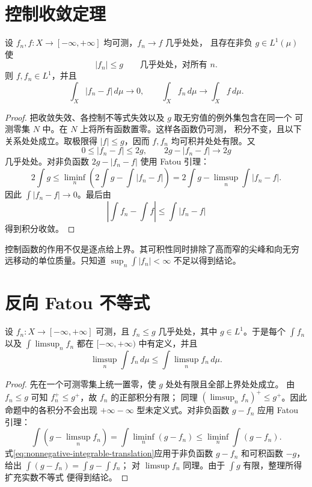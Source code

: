 \section{控制收敛定理}

\begin{theorem}
\label{thm:dominated-convergence}
设 \(f_n,f:X\to[-\infty,+\infty]\) 均可测，\(f_n\to f\) 几乎处处，
且存在非负 \(g\in L^1(\mu)\) 使
\[
 |f_n|\le g\qquad\text{几乎处处，对所有 }n.
\]
则 \(f,f_n\in L^1\)，并且
\[
 \int_X|f_n-f|\,d\mu\longrightarrow0,
 \qquad
 \int_Xf_n\,d\mu\longrightarrow\int_Xf\,d\mu .
\]
\end{theorem}

\begin{proof}
把收敛失效、各控制不等式失效以及 \(g\) 取无穷值的例外集包含在同一个
可测零集 \(N\) 中。在 \(N\) 上将所有函数置零。这样各函数仍可测，
积分不变，且以下关系处处成立。取极限得 \(|f|\le g\)，因而 \(f,f_n\)
均可积并处处有限。又
\[
 0\le |f_n-f|\le2g,\qquad
 2g-|f_n-f|\longrightarrow2g
\]
几乎处处。对非负函数 \(2g-|f_n-f|\) 使用 Fatou 引理：
\[
 2\int g
 \le\liminf_n\left(2\int g-\int|f_n-f|\right)
 =2\int g-\limsup_n\int|f_n-f|.
\]
因此 \(\int|f_n-f|\to0\)。最后由
\[
 \left|\int f_n-\int f\right|
 \le\int|f_n-f|
\]
得到积分收敛。
\end{proof}

\begin{remark}
控制函数的作用不仅是逐点给上界。其可积性同时排除了高而窄的尖峰和向无穷
远移动的单位质量。只知道 \(\sup_n\int|f_n|<\infty\) 不足以得到结论。
\end{remark}

\section{反向 Fatou 不等式}

\begin{proposition}[反向 Fatou]
\label{prop:reverse-fatou}
设 \(f_n:X\to[-\infty,+\infty]\) 可测，且 \(f_n\le g\) 几乎处处，其中
\(g\in L^1\)。于是每个 \(\int f_n\) 以及
\(\int\limsup_nf_n\) 都在 \([ -\infty,+\infty)\) 中有定义，并且
\[
 \limsup_n\int f_n\,d\mu
 \le\int\limsup_nf_n\,d\mu .
\]
\end{proposition}

\begin{proof}
先在一个可测零集上统一置零，使 \(g\) 处处有限且全部上界处处成立。
由 \(f_n\le g\) 可知 \(f_n^+\le g^+\)，故 \(f_n\) 的正部积分有限；
同理 \((\limsup_nf_n)^+\le g^+\)。因此命题中的各积分不会出现
\(+\infty-\infty\) 型未定义式。对非负函数 \(g-f_n\) 应用 Fatou 引理：
\[
 \int(g-\limsup_nf_n)
 =\int\liminf_n(g-f_n)
 \le\liminf_n\int(g-f_n).
\]
式\eqref{eq:nonnegative-integrable-translation}应用于非负函数 \(g-f_n\)
和可积函数 \(-g\)，给出 \(\int(g-f_n)=\int g-\int f_n\)；
对 \(\limsup f_n\) 同理。由于 \(\int g\) 有限，整理所得扩充实数不等式
便得到结论。
\end{proof}

